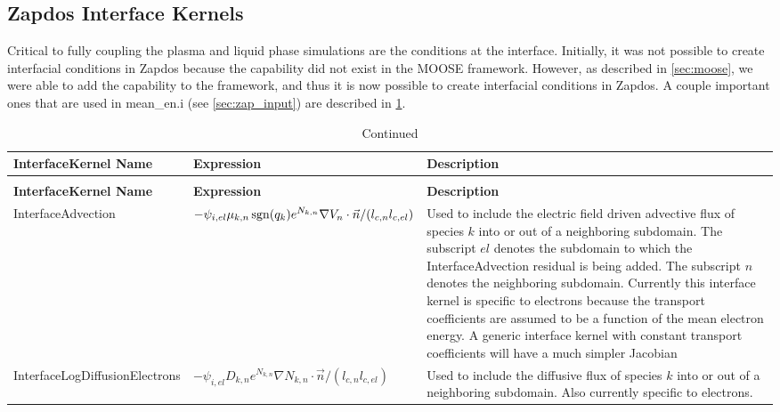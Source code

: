 \subsection{Zapdos Interface Kernels}
\label{sec:zap_interface}

Critical to fully coupling the plasma and liquid phase simulations are the conditions at the interface. Initially, it was not possible to create interfacial conditions in Zapdos because the capability did not exist in the MOOSE framework. However, as described in \cref{sec:moose}, we were able to add the capability to the framework, and thus it is now possible to create interfacial conditions in Zapdos. A couple important ones that are used in mean\_en.i (see \cref{sec:zap_input}) are described in \cref{tab:interface}.

\begin{ThreePartTable}

  \begin{TableNotes}
  \end{TableNotes}

  \begin{longtable}{>{\centering}m{2in}| >{\centering}m{1.75in}| >{\raggedright\arraybackslash}m{1.75in}}
    \caption{Important InterfaceKernels in Zapdos} \label{tab:interface} \\\toprule
    \textbf{InterfaceKernel Name} & \textbf{Expression} & \textbf{Description}\\\hline\hline
    \endfirsthead
    \caption{Continued}\\\toprule
    \textbf{InterfaceKernel Name} & \textbf{Expression} & \textbf{Description}\\\hline\hline
    \endhead
    \endfoot
    \endlastfoot

    InterfaceAdvection & \(\displaystyle -\psi_{i,el}\mu_{k,n}\operatorname{sgn}(q_k) e^{N_{k,n}}\nabla V_n \cdot \vec{n} / (l_{c,n}l_{c,el})\) & Used to include the electric field driven advective flux of species $k$ into or out of a neighboring subdomain. The subscript $el$ denotes the subdomain to which the InterfaceAdvection residual is being added. The subscript $n$ denotes the neighboring subdomain. Currently this interface kernel is specific to electrons because the transport coefficients are assumed to be a function of the mean electron energy. A generic interface kernel with constant transport coefficients will have a much simpler Jacobian\\\hline
    InterfaceLogDiffusionElectrons & \(\displaystyle -\psi_{i,el} D_{k,n} e^{N_{k,n}} \nabla N_{k,n} \cdot \vec{n} / (l_{c,n}l_{c,el})\) & Used to include the diffusive flux of species $k$ into or out of a neighboring subdomain. Also currently specific to electrons.\\\hline
  \end{longtable}
\end{ThreePartTable}

